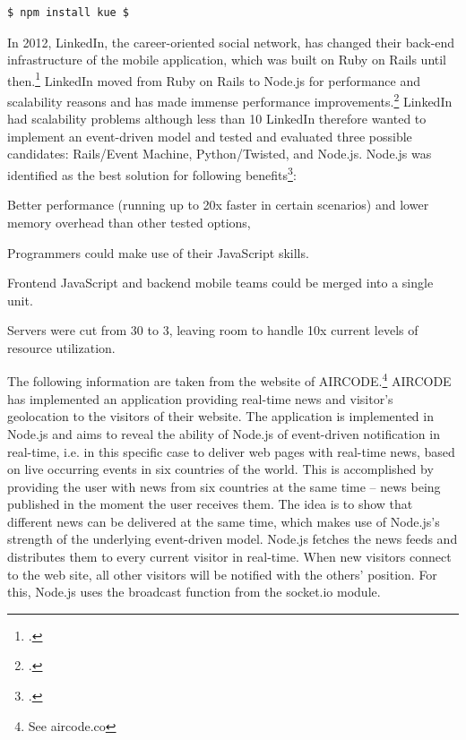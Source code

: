 \begin{appendices}
\begin{subappendices}
\begin{lstlisting}[language=javascript,caption={Installing Kue via command-line},label=lst:installkue]
$ npm install kue $
\end{lstlisting}

In 2012, LinkedIn, the career-oriented social network, has changed their back-end infrastructure of the mobile application, which was built on Ruby on Rails until then.\footcite[Cf.][]{Avram_2012} LinkedIn moved from Ruby on Rails to Node.js for performance and scalability reasons and has made immense performance improvements.\footcite[Cf.][]{ODell_2011} 
LinkedIn had scalability problems although less than 10%
LinkedIn therefore wanted to implement an event-driven model and tested and evaluated three possible candidates: Rails/Event Machine, Python/Twisted, and Node.js.
Node.js was identified as the best solution for following benefits\footcite[Cf.][]{Avram_2012}:
\begin{description}
  \item Better performance (running up to 20x faster in certain scenarios) and lower memory overhead than other tested options, 
  \item Programmers could make use of their JavaScript skills. 
  \item Frontend JavaScript and backend mobile teams could be merged into a single unit. 
  \item Servers were cut from 30 to 3, leaving room to handle 10x current levels of resource utilization.
\end{description}


The following information are taken from the website of AIRCODE.\footnote{See aircode.co}
AIRCODE has implemented an application providing real-time news and visitor’s geolocation to the visitors of their website. The application is implemented in Node.js and aims to reveal the ability of Node.js of event-driven notification in real-time, i.e. in this specific case to deliver web pages with real-time news, based on live occurring events in six countries of the world. This is accomplished by providing the user with news from six countries at the same time – news being published in the moment the user receives them. The idea is to show that different news can be delivered at the same time, which makes use of Node.js’s strength of the underlying event-driven model.
Node.js fetches the news feeds and distributes them to every current visitor in real-time. When new visitors connect to the web site, all other visitors will be notified with the others’ position. For this, Node.js uses the broadcast function from the socket.io module.


\end{subappendices}
\end{appendices}
